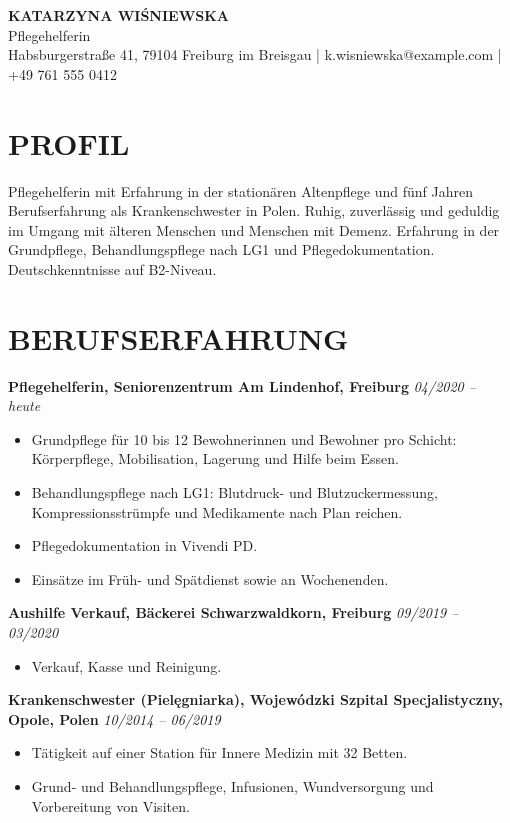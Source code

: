 \documentclass[11pt,a4paper]{article}
\begin{document}
\begin{center}
{\Huge\bfseries\color{primarycolor} KATARZYNA WIŚNIEWSKA}\\[0.3em]
{\large\color{accentcolor} Pflegehelferin}\\[0.3em]
{\small Habsburgerstraße 41, 79104 Freiburg im Breisgau | k.wisniewska@example.com | +49 761 555 0412}
\end{center}

\section*{PROFIL}
Pflegehelferin mit Erfahrung in der stationären Altenpflege und fünf Jahren Berufserfahrung als Krankenschwester in Polen. Ruhig, zuverlässig und geduldig im Umgang mit älteren Menschen und Menschen mit Demenz. Erfahrung in der Grundpflege, Behandlungspflege nach LG1 und Pflegedokumentation. Deutschkenntnisse auf B2-Niveau.

\section*{BERUFSERFAHRUNG}
\textbf{Pflegehelferin, Seniorenzentrum Am Lindenhof, Freiburg} \hfill \textit{04/2020 – heute}
\begin{itemize}
\item Grundpflege für 10 bis 12 Bewohnerinnen und Bewohner pro Schicht: Körperpflege, Mobilisation, Lagerung und Hilfe beim Essen.
\item Behandlungspflege nach LG1: Blutdruck- und Blutzuckermessung, Kompressionsstrümpfe und Medikamente nach Plan reichen.
\item Pflegedokumentation in Vivendi PD.
\item Einsätze im Früh- und Spätdienst sowie an Wochenenden.
\end{itemize}

\textbf{Aushilfe Verkauf, Bäckerei Schwarzwaldkorn, Freiburg} \hfill \textit{09/2019 – 03/2020}
\begin{itemize}
\item Verkauf, Kasse und Reinigung.
\end{itemize}

\textbf{Krankenschwester (Pielęgniarka), Wojewódzki Szpital Specjalistyczny, Opole, Polen} \hfill \textit{10/2014 – 06/2019}
\begin{itemize}
\item Tätigkeit auf einer Station für Innere Medizin mit 32 Betten.
\item Grund- und Behandlungspflege, Infusionen, Wundversorgung und Vorbereitung von Visiten.
\end{itemize}
\end{document}
